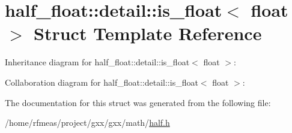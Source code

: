 \hypertarget{structhalf__float_1_1detail_1_1is__float_3_01float_01_4}{}\section{half\+\_\+float\+:\+:detail\+:\+:is\+\_\+float$<$ float $>$ Struct Template Reference}
\label{structhalf__float_1_1detail_1_1is__float_3_01float_01_4}


Inheritance diagram for half\+\_\+float\+:\+:detail\+:\+:is\+\_\+float$<$ float $>$\+:


Collaboration diagram for half\+\_\+float\+:\+:detail\+:\+:is\+\_\+float$<$ float $>$\+:


The documentation for this struct was generated from the following file\+:\begin{DoxyCompactItemize}
\item 
/home/rfmeas/project/gxx/gxx/math/\hyperlink{half_8h}{half.\+h}\end{DoxyCompactItemize}
